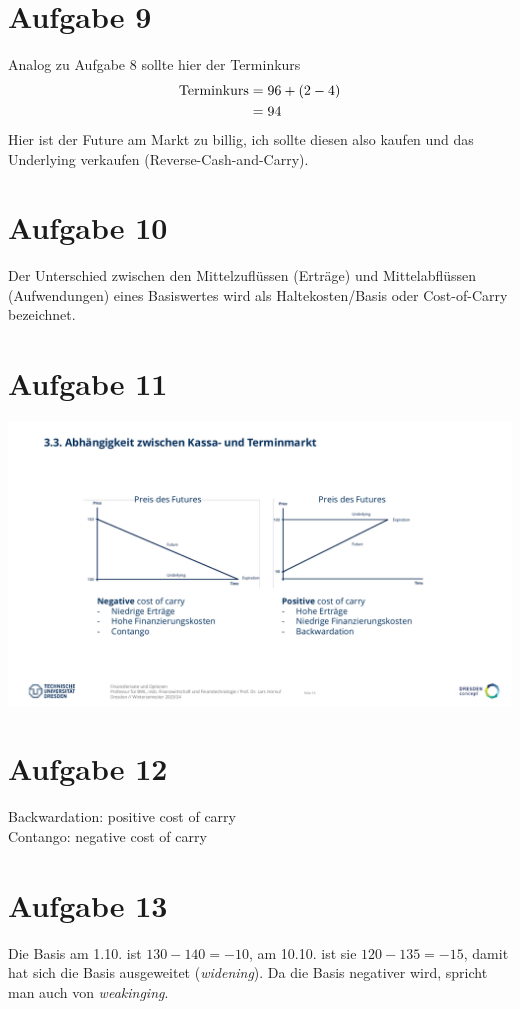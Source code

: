 \documentclass{article}
\begin{document}
	\section*{Aufgabe 9}
	Analog zu Aufgabe 8 sollte hier der Terminkurs
	\begin{align}
		\text{Terminkurs} &= 96 + (2 - 4) \notag \\
		&= 94 \notag
	\end{align}
	Hier ist der Future am Markt zu billig, ich sollte diesen also kaufen und das Underlying verkaufen (Reverse-Cash-and-Carry).
	
	\section*{Aufgabe 10}
	Der Unterschied zwischen den Mittelzuflüssen (Erträge) und Mittelabflüssen (Aufwendungen) eines Basiswertes wird als Haltekosten/Basis oder Cost-of-Carry bezeichnet.
	
	\section*{Aufgabe 11}
	\begin{center}
		\includegraphics[scale=0.5]{Aufgabe 3.11}
	\end{center}
	
	\section*{Aufgabe 12}
	Backwardation: positive cost of carry \\
	Contango: negative cost of carry
	
	\section*{Aufgabe 13}
	Die Basis am 1.10. ist $130-140 = -10$, am 10.10. ist sie $120-135 = -15$, damit hat sich die Basis ausgeweitet (\textit{widening}). Da die Basis negativer wird, spricht man auch von \textit{weakinging}.
	
\end{document}
